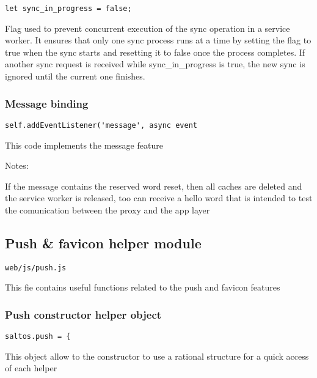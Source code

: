 \documentclass[a4paper]{article}
\begin{document}
\begin{lstlisting}
let sync_in_progress = false;
\end{lstlisting}

Flag used to prevent concurrent execution of the sync operation in a service worker.
It ensures that only one sync process runs at a time by setting the flag to true
when the sync starts and resetting it to false once the process completes. If another
sync request is received while sync\_in\_progress is true, the new sync is ignored
until the current one finishes.

\hypertarget{toc834}{}
\subsubsection{Message binding}

\begin{lstlisting}
self.addEventListener('message', async event
\end{lstlisting}

This code implements the message feature

Notes:

If the message contains the reserved word reset, then all caches are deleted
and the service worker is released, too can receive a hello word that is intended
to test the comunication between the proxy and the app layer

\hypertarget{toc835}{}
\subsection{Push \& favicon helper module}

\begin{lstlisting}
web/js/push.js
\end{lstlisting}

This fie contains useful functions related to the push and favicon features

\hypertarget{toc836}{}
\subsubsection{Push constructor helper object}

\begin{lstlisting}
saltos.push = {
\end{lstlisting}

This object allow to the constructor to use a rational structure for a quick access of each
helper

\hypertarget{toc837}{}
\end{document}
